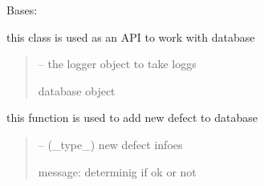 \documentclass[letterpaper,10pt,english]{sphinxmanual}
\begin{document}
\begin{savenotes}\begin{fulllineitems}
\label{\detokenize{setting/database_utils:oxin.database_utils.dataBaseUtils}}
\pysigstartsignatures
{}
\pysigstopsignatures
\sphinxAtStartPar
Bases: 

\sphinxAtStartPar
this class is used as an API to work with database
\begin{quote}\begin{description}
\sphinxAtStartPar
{} – the logger object to take loggs

\sphinxAtStartPar
database object

\end{description}\end{quote}

\begin{savenotes}\begin{fulllineitems}
\label{\detokenize{setting/database_utils:oxin.database_utils.dataBaseUtils.add_defect}}
\pysigstartsignatures
{}
\pysigstopsignatures
\sphinxAtStartPar
this function is used to add new defect to database
\begin{quote}\begin{description}
\sphinxAtStartPar
{} – (\_type\_) new defect infoes

\sphinxAtStartPar
message: determinig if ok or not

\end{description}\end{quote}

\end{fulllineitems}\end{savenotes}



\end{fulllineitems}
\end{savenotes}
\end{document}
